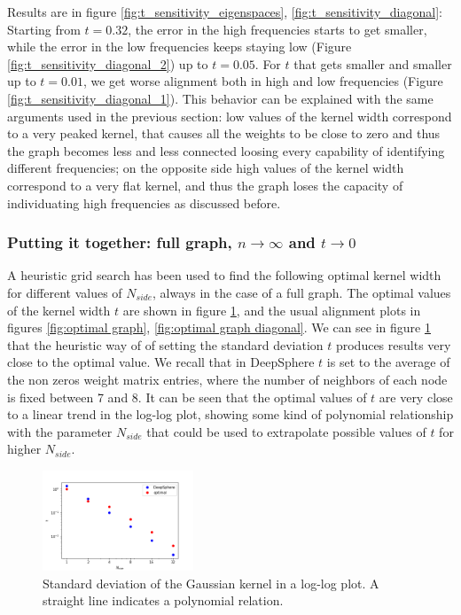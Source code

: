 Results are in figure \ref{fig:t_sensitivity_eigenspaces}, \ref{fig:t_sensitivity_diagonal}: Starting from $t=0.32$, the error in the high frequencies starts to get smaller, while the error in the low frequencies keeps staying low (Figure \ref{fig:t_sensitivity_diagonal_2}) up to $t=0.05$. For $t$ that gets smaller and smaller up to $t=0.01$, we get worse alignment both in high and low frequencies (Figure \ref{fig:t_sensitivity_diagonal_1}). This behavior can be explained with the same arguments used in the previous section: low values of the kernel width correspond to a very peaked kernel, that causes all the weights to be close to zero and thus the graph becomes less and less connected loosing every capability of identifying different frequencies; on the opposite side high values of the kernel width correspond to a very flat kernel, and thus the graph loses the capacity of individuating high frequencies as discussed before.

\subsubsection{Putting it together: full graph, $n\to\infty$ and $t\to 0$}
A heuristic grid search has been used to find the following optimal kernel width for different values of $N_{side}$, always in the case of a full graph. The optimal values of the kernel width $t$ are shown in figure \ref{fig:t}, and the usual alignment plots in figures \ref{fig:optimal graph}, \ref{fig:optimal graph diagonal}. We can see in figure \ref{fig:t} that the heuristic way of \cite{DeepSphere} of setting the standard deviation $t$ produces results very close to the optimal value. We recall that in DeepSphere $t$ is set to the average of the non zeros weight matrix entries, where the number of neighbors of each node is fixed between 7 and 8. It can be seen that the optimal values of $t$ are very close to a linear trend in the log-log plot, showing some kind of polynomial relationship with the parameter $N_{side}$ that could be used to extrapolate possible values of $t$ for higher $N_{side}$.

\begin{figure}[h]
	\label{fig:t}
	
	\centering
	\includegraphics[width=0.4\textwidth]{../codes/02.HeatKernelGraphLaplacian/HEALPix/06_figures/kernelwidth.png}
\caption{Standard deviation of the Gaussian kernel  in a log-log plot. A straight line indicates a polynomial relation.}
\end{figure}

